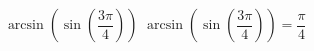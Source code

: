  {$\arcsin\left(\sin\left(\dfrac{3\pi}{4}\right) \right)$}
{ $\arcsin\left(\sin\left(\dfrac{3\pi}{4}\right) \right) = \dfrac{\pi}{4}$}
